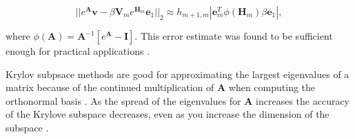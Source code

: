 \begin{equation}
    ||e^{\boldsymbol{A}}\boldsymbol{v} - \beta \boldsymbol{V}_{m}e^{\boldsymbol{H}_{m}}\boldsymbol{e}_{1}||_{2} \approx h_{m+1,m}|\boldsymbol{e}_{m}^{T}\phi(\boldsymbol{H}_{m})\beta \boldsymbol{e}_{1}|,
\end{equation}

\noindent where $\phi(\boldsymbol{A}) = \boldsymbol{A}^{-1}[e^{\boldsymbol{A}} - \boldsymbol{I}]$. This error estimate was found to be sufficient enough for practical applications \cite{saad1992}. 

Krylov subpsace methods are good for approximating the largest eigenvalues of a matrix because of the continued multiplication of $\boldsymbol{A}$ when computing the orthonormal basis \cite{akio2007}. As the spread of the eigenvalues for $\boldsymbol{A}$ increases the accuracy of the Krylove subspace decreases, even as you increase the dimension of the subspace \cite{pusa2010}. 